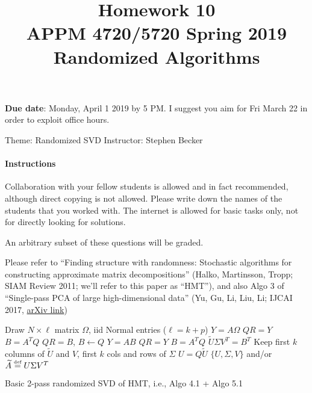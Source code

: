 \documentclass[10pt, letterpaper]{scrartcl}
\title{Homework 10 \solTitle{Selected Solutions} \\APPM 4720/5720 Spring 2019 \\ Randomized Algorithms}
\date{}
\newenvironment{instructions}{}{}
\begin{document}
\maketitle
\vspace{-6em}
\textbf{Due date}: Monday, April 1 2019 by 5 PM. I suggest you aim for Fri March 22 in order to exploit office hours.

Theme: Randomized SVD   \hfill Instructor: Stephen Becker %

\begin{instructions}
\paragraph{Instructions}
Collaboration with your fellow students is allowed and in fact recommended, although direct copying is not allowed.  Please write down the names of the students that you worked with. The internet is allowed for basic tasks only, not for directly looking for solutions.

An arbitrary subset of these questions will be graded.

\end{instructions}


\vspace{2em}
Please refer to ``Finding structure with randomness: Stochastic algorithms for constructing approximate matrix decompositions'' (Halko, Martinsson, Tropp; SIAM Review 2011; we'll refer to this paper as ``HMT''), and also Algo 3 of ``Single-pass PCA of large high-dimensional data'' (Yu, Gu, Li, Liu, Li; IJCAI 2017, \href{https://arxiv.org/abs/1704.07669}{arXiv link})

\begin{algorithm}
    \begin{algorithmic}[1]
          
        \State Draw $N \times \ell$ matrix $\Omega$, iid Normal entries ($\ell = k+p$)
        \State $Y = A\Omega$
        \State $QR=Y$ 
         
        \State $B=A^T Q$
        \State $QR = B$, $B \gets Q$
        \State $Y = AB$
        \State $QR=Y$
        \EndFor
        \State $B=A^TQ$ 
        \State $\widetilde{U}\Sigma V^T = B^T$ 
        \State Keep first $k$ columns of $\widetilde{U}$ and $V$, first $k$ cols and rows of $\Sigma$
        \State $U = Q\widetilde{U}$
        \State \Return $\{U,\Sigma,V\}$ and/or $\widetilde{A} \stackrel{\text{\tiny def}}{=} U\Sigma V^T$
        \EndProcedure
    \end{algorithmic}
\caption{Basic 2-pass randomized SVD of HMT, i.e., Algo 4.1 + Algo 5.1}\label{algo:1}
\end{algorithm}
\end{document}
